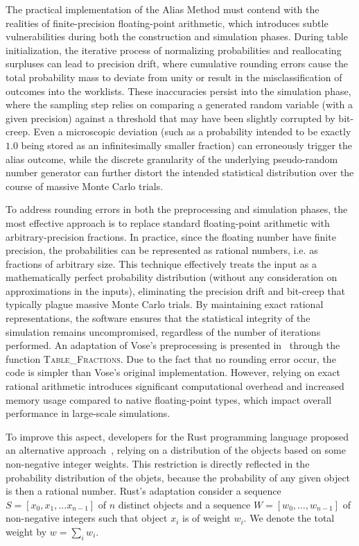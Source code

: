 The practical implementation of the Alias Method must contend with the realities of finite-precision floating-point arithmetic, 
which introduces subtle vulnerabilities during both the construction and simulation phases. During table initialization, 
the iterative process of normalizing probabilities and reallocating surpluses can lead to precision drift, where cumulative 
rounding errors cause the total probability mass to deviate from unity or result in the misclassification of outcomes into the worklists. 
These inaccuracies persist into the simulation phase, where the sampling step relies on comparing a generated random 
variable (with a given precision) against a threshold that may have been slightly corrupted by bit-creep. Even a microscopic deviation 
(such as a probability intended to be exactly $1.0$ being stored as an infinitesimally smaller fraction) 
can erroneously trigger the alias outcome, while the discrete granularity of the underlying pseudo-random number 
generator can further distort the intended statistical distribution over the course of massive Monte Carlo trials.

To address rounding errors in both the preprocessing and simulation phases, the most effective approach
is to replace standard floating-point arithmetic with arbitrary-precision fractions.
In practice, since the floating number have finite precision, the probabilities can be represented as rational numbers, i.e. as fractions of arbitrary size. 
This technique effectively treats the input as a mathematically perfect probability distribution
(without any consideration on approximations in the inputs), eliminating the precision drift and 
bit-creep that typically plague massive Monte Carlo trials. By maintaining exact rational representations,
the software ensures that the statistical integrity of the simulation remains uncompromised, 
regardless of the number of iterations performed.
An adaptation of Vose's preprocessing is presented in~ through the function \textsc{Table\_Fractions}. Due to the fact that no rounding error occur, the code
is simpler than Vose's original implementation.
However, relying on exact rational arithmetic introduces significant computational overhead and 
increased memory usage compared to native floating-point types, which impact
overall performance in large-scale simulations.

To improve this aspect, developers for the Rust programming language proposed 
an alternative approach~\cite{Rust25},
relying on a distribution of the objects based on some non-negative integer weights.
This restriction is directly reflected in the probability distribution of the objets, because the probability of any given object is then
a rational number. Rust's adaptation consider a sequence $S = [x_0, x_1, \dots x_{n-1}]$ of $n$ distinct objects and a sequence 
$W =[w_0, \dots, w_{n-1}]$ of non-negative integers such that object $x_i$ is of weight $w_i$. 
We denote the total weight by $w = \sum_i w_i$.


